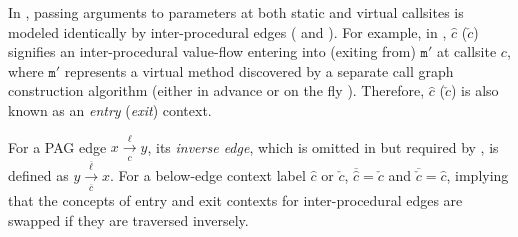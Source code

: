 In \manuLFC, 
passing arguments to  parameters at both static and virtual callsites is
modeled identically by inter-procedural  edges ( and ).
For example, in , $\hat{c}$ ($\check{c}$) signifies an inter-procedural value-flow entering into (exiting from) $\mathtt{m'}$ at callsite $c$, where  $\mathtt{m'}$ represents a 
virtual method  discovered by a separate call graph construction algorithm
(either in advance \cite{dean1995optimization, bacon1996fast, sundaresan2000practical} or
on the fly  \cite{sridharan2005demand, sridharan2006refinement}). Therefore, 
$\hat{c}$ ($\check{c}$) is also known as an \textit{entry} (\textit{exit}) context.



For a PAG edge 
$x\xrightarrow[c]{\ell}y$, its \textit{inverse edge}, which is omitted in  but  required by \manuLFC, is defined as 
$y\xrightarrow[\overline{c}]{\overline{\ell}}x$.
For a below-edge  context label $\hat{c}$ or $\check{c}$, 
$\overline{\hat{c}}=\check{c}$ and
$\overline{\check{c}}=\hat{c}$, implying that the concepts
of entry and exit contexts  for inter-procedural 
edges are swapped if they are traversed inversely.

